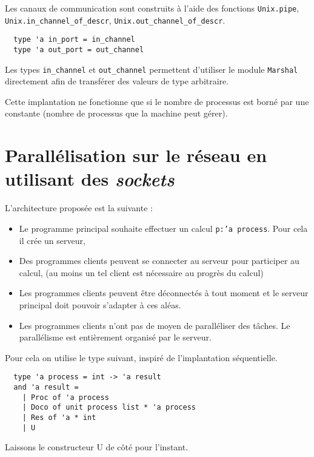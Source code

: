 \documentclass[11pt]{article}
\begin{document}
\smallskip

Les canaux de communication sont construits \`a l'aide des fonctions
{\tt Unix.pipe},
{\tt Unix.in\_channel\_of\_descr}, {\tt Unix.out\_channel\_of\_descr}.

\begin{lstlisting}
  type 'a in_port = in_channel
  type 'a out_port = out_channel
\end{lstlisting}

Les types {\tt in\_channel} et {\tt out\_channel} permettent d'utiliser
le module {\tt Marshal} directement afin de transf\'erer des valeurs
de type arbitraire.

\smallskip

Cette implantation ne fonctionne que si le nombre de processus est
born\'e par une constante (nombre de processus que la machine peut g\'erer).

\section{Parall\'elisation sur le r\'eseau en utilisant des {\em sockets}}

L'architecture propos\'ee est la suivante :

\begin{itemize}
  \item Le programme principal souhaite effectuer un calcul
    {\tt p:'a process}. Pour cela il cr\'ee un serveur,
  \item Des programmes clients peuvent se connecter au serveur pour
    participer au calcul,
    (au moins un tel client est n\'ecessaire au progr\`es du calcul)
  \item Les programmes clients peuvent \^etre d\'econnect\'es \`a tout moment
    et le serveur principal doit pouvoir s'adapter \`a ces al\'eas.
  \item Les programmes clients n'ont pas de moyen de parall\'eliser
    des t\^aches. Le parall\'elisme est enti\`erement organis\'e
    par le serveur.
\end{itemize}

Pour cela on utilise le type suivant, inspir\'e de l'implantation
s\'equentielle.

\begin{lstlisting}
  type 'a process = int -> 'a result
  and 'a result =
    | Proc of 'a process
    | Doco of unit process list * 'a process
    | Res of 'a * int
    | U
\end{lstlisting}

Laissons le constructeur U de c\^ot\'e pour l'instant.
\end{document}
